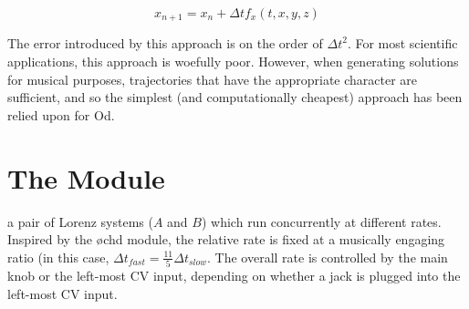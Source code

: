 \documentclass{tufte-handout}
\begin{document}
$$x_{n+1} = x_n + \Delta t f_{x}(t, x, y, z)$$

The error introduced by this approach is on the order of ${\Delta t}^2$. For most scientific applications, this approach is woefully poor. However, when generating solutions for musical purposes, trajectories that have the appropriate character are sufficient, and so the simplest (and computationally cheapest) approach has been relied upon for Od.

\section{The Module}\label{sec:the_module}

 a pair of Lorenz systems ($A$ and $B$) which run concurrently at different rates. Inspired by the \o chd module, the relative rate is fixed at a musically engaging ratio (in this case, $\Delta t_{fast} = \frac{11}{5} \Delta t_{slow}$. The overall rate is controlled by the main knob or the left-most CV input, depending on whether a jack is plugged into the left-most CV input.
\end{document}
